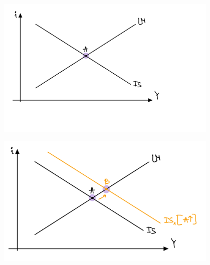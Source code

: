 \documentclass[usenames,dvipsnames]{beamer}
\begin{document}
\begin{RTL}
\begin{frame}[allowframebreaks]
            \begin{figure}[H]
                    \begin{center}
                        \includegraphics[width=0.95\textwidth]{figures/ISLM default.png}
                    \end{center}
                    \label{fig:}
            \end{figure}
            
            \begin{figure}[H]
                \begin{small}
                    \begin{center}
                        \includegraphics[width=0.95\textwidth]{figures/ISLM IS move.png}
                    \end{center}
                    \label{fig:}
                \end{small}
            \end{figure}
            

\end{frame}
\end{RTL}
\end{document}
